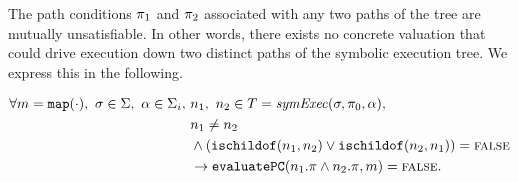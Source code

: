 \begin{property}
  \label{prop:kingunique}
The path conditions $\pi_1$ and $\pi_2$ associated with any two paths of the
tree are mutually unsatisfiable. In other words, there exists no concrete
valuation that could drive execution down two distinct paths of the symbolic
execution tree. We express this in the following. 

\begin{align*}
\forall m = \mathtt{map(\cdot)},~\sigma \in \Sigma,~\alpha \in
\Sigma_i,~& n_1,~ n_2 \in T =
\mathit{symExec}(\sigma,\pi_0,\alpha), \\
& n_1 \neq n_2 \\
&  \wedge
(\mathtt{ischildof}(n_1, n_2) \vee  \mathtt{ischildof}(n_2, n_1))= \mathtt{\textsc{false}} \\
&\rightarrow \mathtt{evaluatePC}(n_1.\pi \wedge n_2.\pi,m) = \mathtt{\textsc{false}}.
\end{align*}

\end{property}

